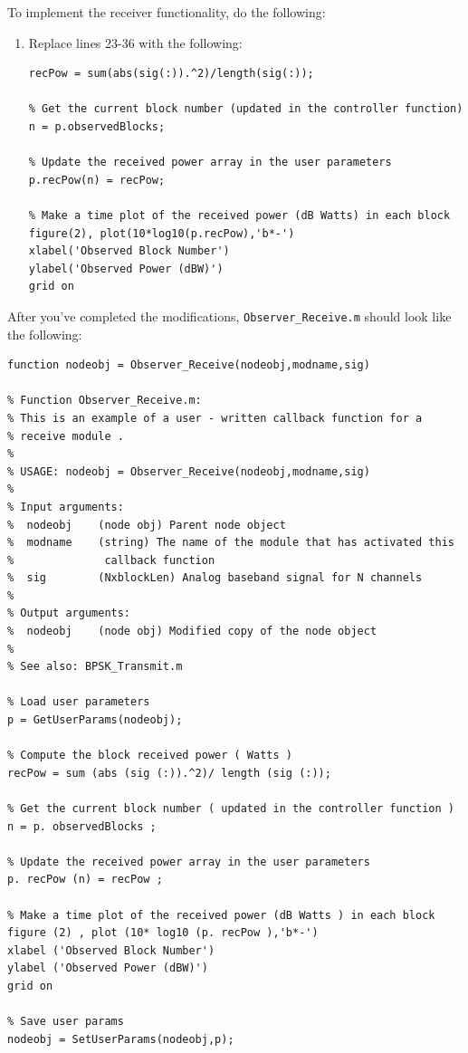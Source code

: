 To implement the receiver functionality, do the following:
\setcounter{enumitemp}{\theenumi}
\begin{enumerate}
\setcounter{enumi}{\theenumitemp}
\item Replace lines 23-36 with the following:
%
\begin{lstlisting}[firstnumber=23]
% Compute the block received power (Watts)
recPow = sum(abs(sig(:)).^2)/length(sig(:));

% Get the current block number (updated in the controller function)
n = p.observedBlocks;

% Update the received power array in the user parameters
p.recPow(n) = recPow;

% Make a time plot of the received power (dB Watts) in each block
figure(2), plot(10*log10(p.recPow),'b*-')
xlabel('Observed Block Number')
ylabel('Observed Power (dBW)')
grid on
\end{lstlisting}
%
\end{enumerate}
After you've completed the modifications, \verb+Observer_Receive.m+ should look like the following:
%
\begin{lstlisting}[firstnumber=1]
function nodeobj = Observer_Receive(nodeobj,modname,sig)

% Function Observer_Receive.m:
% This is an example of a user - written callback function for a
% receive module .
%
% USAGE: nodeobj = Observer_Receive(nodeobj,modname,sig)
%
% Input arguments:
%  nodeobj    (node obj) Parent node object
%  modname    (string) The name of the module that has activated this
%              callback function
%  sig        (NxblockLen) Analog baseband signal for N channels
%
% Output arguments:
%  nodeobj    (node obj) Modified copy of the node object
%
% See also: BPSK_Transmit.m

% Load user parameters
p = GetUserParams(nodeobj);

% Compute the block received power ( Watts )
recPow = sum (abs (sig (:)).^2)/ length (sig (:));

% Get the current block number ( updated in the controller function )
n = p. observedBlocks ;

% Update the received power array in the user parameters
p. recPow (n) = recPow ;

% Make a time plot of the received power (dB Watts ) in each block
figure (2) , plot (10* log10 (p. recPow ),'b*-')
xlabel ('Observed Block Number')
ylabel ('Observed Power (dBW)')
grid on

% Save user params
nodeobj = SetUserParams(nodeobj,p);
\end{lstlisting}
%

